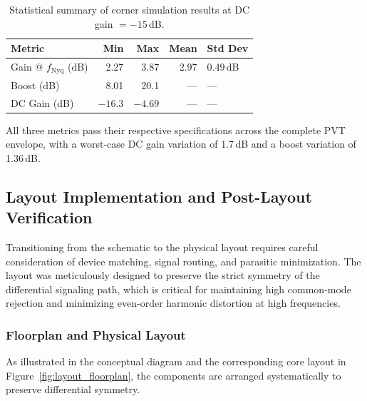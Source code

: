 \begin{table}[H]
    \centering
    \caption{Statistical summary of corner simulation results at DC gain $= -15$\,dB.}
    \label{tab:corner_summary}
    \begin{tabular}{lrrrl}
        \toprule
        \textbf{Metric}  & \textbf{Min} & \textbf{Max} & \textbf{Mean} & \textbf{Std Dev} \\
        \midrule
        Gain @ $f_{\mathrm{Nyq}}$ (dB)         & 2.27  & 3.87  & 2.97  & 0.49\,dB  \\
        Boost (dB)                              & 8.01  & 20.1  & —  & — \\
        DC Gain (dB)                    & $-16.3$ & $-4.69$  & —  & — \\
        \bottomrule
    \end{tabular}
\end{table}

\noindent All three metrics pass their respective specifications across the complete PVT envelope, with a worst-case DC gain variation of 1.7\,dB and a boost variation of 1.36\,dB.

\subsection{Layout Implementation and Post-Layout Verification}
\label{sec:layout_pex}

Transitioning from the schematic to the physical layout requires careful consideration of device matching, signal routing, and parasitic minimization. The layout was meticulously designed to preserve the strict symmetry of the differential signaling path, which is critical for maintaining high common-mode rejection and minimizing even-order harmonic distortion at high frequencies.

\subsubsection{Floorplan and Physical Layout}
As illustrated in the conceptual diagram and the corresponding core layout in Figure~\ref{fig:layout_floorplan}, the components are arranged systematically to preserve differential symmetry. 

